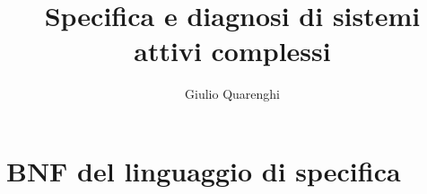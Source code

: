 \documentclass[11pt,a4paper,oneside]{book}
\author{Giulio Quarenghi}
\title{\large Specifica e diagnosi di sistemi attivi complessi}
\theoremstyle{plain}
\theoremstyle{definition}
\theoremstyle{definition}
\theoremstyle{remark}
\begin{document}

\frontmatter
	\tableofcontents



\mainmatter








\appendix
\chapter{BNF del linguaggio di specifica} \label{bnf}




\listoffigures

\nocite{*}


\end{document}
